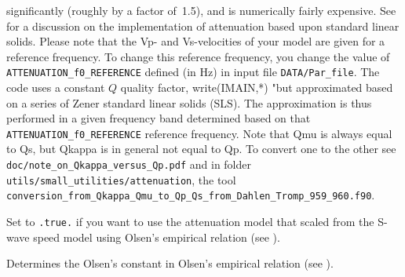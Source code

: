 \begin{description}
significantly (roughly by a factor of~1.5), and is numerically fairly
expensive. See \citet{KoTr99,KoTr02a} for a discussion on the implementation
of attenuation based upon standard linear solids. Please note that
the Vp- and Vs-velocities of your model are given for a reference
frequency. To change this reference frequency, you change the value
of \texttt{ATTENUATION\_f0\_REFERENCE} defined (in Hz) in input file \texttt{DATA/Par\_file}.
The code uses a constant $Q$ quality factor, write(IMAIN,*) "but approximated based on a series of Zener standard linear solids (SLS).
The approximation is thus performed in a given frequency band determined based on that \texttt{ATTENUATION\_f0\_REFERENCE} reference frequency.
Note that Qmu is always equal to Qs, but Qkappa is in general not equal to Qp.
To convert one to the other see \texttt{doc/note\_on\_Qkappa\_versus\_Qp.pdf}
and in folder \texttt{utils/small\_utilities/attenuation}, the tool
\texttt{conversion\_from\_Qkappa\_Qmu\_to\_Qp\_Qs\_from\_Dahlen\_Tromp\_959\_960.f90}.
%
\item [{\texttt{USE\_OLSEN\_ATTENUATION}}] Set to \texttt{.true.} if you
want to use the attenuation model that scaled from the S-wave speed
model using Olsen's empirical relation (see \citet{OlDaBr03}).
%
\item [{\texttt{OLSEN\_ATTENUATION\_RATIO}}] Determines the Olsen's constant
in Olsen's empirical relation (see \citet{OlDaBr03}).
\end{description}

